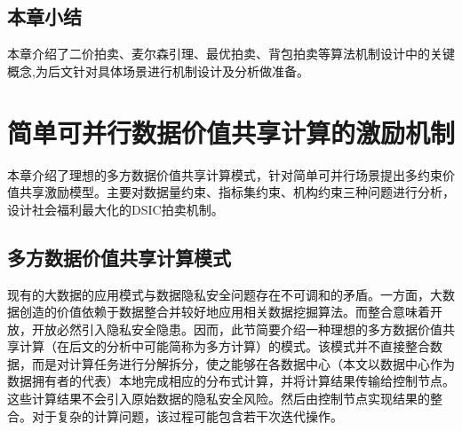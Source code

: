 \documentclass[promaster]{thesis-uestc}
\begin{document}
%
%
%
%

\section{本章小结}
本章介绍了二价拍卖、麦尔森引理、最优拍卖、背包拍卖等算法机制设计中的关键概念,为后文针对具体场景进行机制设计及分析做准备。

\chapter{简单可并行数据价值共享计算的激励机制}
本章介绍了理想的多方数据价值共享计算模式，针对简单可并行场景提出多约束价值共享激励模型。主要对数据量约束、指标集约束、机构约束三种问题进行分析，设计社会福利最大化的DSIC拍卖机制。

\section{多方数据价值共享计算模式}
现有的大数据的应用模式与数据隐私安全问题存在不可调和的矛盾。一方面，大数据创造的价值依赖于数据整合并较好地应用相关数据挖掘算法。而整合意味着开放，开放必然引入隐私安全隐患。因而，此节简要介绍一种理想的多方数据价值共享计算（在后文的分析中可能简称为多方计算）的模式。该模式并不直接整合数据，而是对计算任务进行分解拆分，使之能够在各数据中心（本文以数据中心作为数据拥有者的代表）本地完成相应的分布式计算，并将计算结果传输给控制节点。这些计算结果不会引入原始数据的隐私安全风险。然后由控制节点实现结果的整合。对于复杂的计算问题，该过程可能包含若干次迭代操作。
\end{document}
